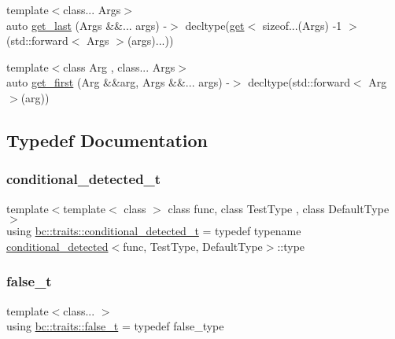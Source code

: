 \begin{DoxyCompactItemize}
\item 
{\footnotesize template$<$class... Args$>$ }\\auto \hyperlink{namespacebc_1_1traits_a96ff03a1928b8a28225a152f7a093cdf}{get\+\_\+last} (Args \&\&... args) -\/$>$ decltype(\hyperlink{namespacebc_1_1traits_a4de446de235c05a01f9143b54df5a136}{get}$<$ sizeof...(Args) -\/1 $>$(std\+::forward$<$ Args $>$(args)...))
\item 
{\footnotesize template$<$class Arg , class... Args$>$ }\\auto \hyperlink{namespacebc_1_1traits_ad9cf2c4adfbd50e98364152dfd32174a}{get\+\_\+first} (Arg \&\&arg, Args \&\&... args) -\/$>$ decltype(std\+::forward$<$ Arg $>$(arg))
\end{DoxyCompactItemize}


\subsection{Typedef Documentation}
\mbox{\label{namespacebc_1_1traits_a1a6d378947ec32acd457890854bcd592}} 
\subsubsection{\texorpdfstring{conditional\+\_\+detected\+\_\+t}{conditional\_detected\_t}}
{\footnotesize\ttfamily template$<$template$<$ class $>$ class func, class Test\+Type , class Default\+Type $>$ \\
using \hyperlink{namespacebc_1_1traits_a1a6d378947ec32acd457890854bcd592}{bc\+::traits\+::conditional\+\_\+detected\+\_\+t} = typedef typename \hyperlink{structbc_1_1traits_1_1conditional__detected}{conditional\+\_\+detected}$<$func, Test\+Type, Default\+Type$>$\+::type}

\mbox{\label{namespacebc_1_1traits_a8742be07ccb2e54481314368169dd551}} 
\subsubsection{\texorpdfstring{false\+\_\+t}{false\_t}}
{\footnotesize\ttfamily template$<$class... $>$ \\
using \hyperlink{namespacebc_1_1traits_a8742be07ccb2e54481314368169dd551}{bc\+::traits\+::false\+\_\+t} = typedef false\+\_\+type}

